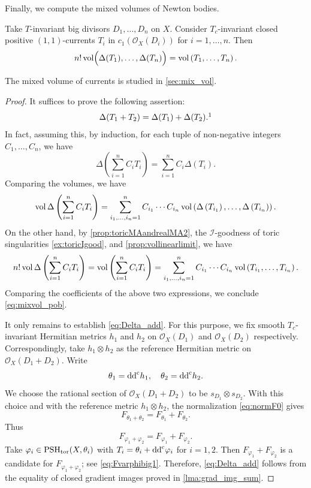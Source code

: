 Finally, we compute the mixed volumes of Newton bodies.
\begin{theorem}\label{thm:mix_vol_newbod}
Take $T$-invariant big divisors $D_1,\ldots,D_n$ on $X$. Consider $T_c$-invariant closed positive $(1,1)$-currents $T_i$ in $c_1(\mathcal{O}_X(D_i))$ for $i=1,\ldots,n$. Then
\begin{equation}\label{eq:mixvol_pob}
n! \operatorname{vol} \Bigl( \Delta(T_1),\ldots,\Delta(T_n) \Bigr)=\operatorname{vol} \left(T_1,\ldots,T_n \right).
\end{equation}
\end{theorem}
The mixed volume of currents is studied in \cref{sec:mix_vol}.
\begin{proof}
    It suffices to prove the following assertion:
    \begin{equation}\label{eq:Delta_add}
    \Delta(T_1+T_2)=\Delta(T_1)+\Delta(T_2).\footnotemark
    \end{equation}
    In fact, assuming this, by induction, for each tuple of non-negative integers $C_1,\ldots,C_n$, we have
    \[
    \Delta\left( \sum_{i=1}^n C_i T_i \right)=\sum_{i=1}^n C_i \Delta(T_i).
    \]
    Comparing the volumes, we have
    \[
    \operatorname{vol} \Delta\left( \sum_{i=1}^n C_i T_i \right)=\sum_{i_1,\ldots,i_n=1}^n C_{i_1}\cdots C_{i_n} \operatorname{vol} \left(\Delta\left(T_{i_1}\right),\ldots,\Delta\left(T_{i_n}\right)\right).
    \]
    On the other hand, by \cref{prop:toricMAandrealMA2}, the $\mathcal{I}$-goodness of toric singularities \cref{ex:toricIgood}, and \cref{prop:vollinearlimit}, we have
    \[
    n! \operatorname{vol} \Delta\left( \sum_{i=1}^n C_i T_i \right)=\operatorname{vol} \left( \sum_{i=1}^n C_i T_i \right)=\sum_{i_1,\ldots,i_n=1}^n C_{i_1}\cdots C_{i_n} \operatorname{vol} \left(T_{i_1},\ldots,T_{i_n}\right).
    \]
    Comparing the coefficients of the above two expressions, we conclude \eqref{eq:mixvol_pob}.

    It only remains to establish \eqref{eq:Delta_add}. For this purpose, we fix smooth $T_c$-invariant Hermitian metrics $h_1$ and $h_2$ on $\mathcal{O}_X(D_1)$ and $\mathcal{O}_X(D_2)$ respectively. Correspondingly, take $h_1\otimes h_2$ as the reference Hermitian metric on $\mathcal{O}_X(D_1+D_2)$. Write
    \[
    \theta_1=\mathrm{dd}^{\mathrm{c}} h_1,\quad \theta_2=\mathrm{dd}^{\mathrm{c}} h_2.
    \]
    We choose the rational section of $\mathcal O_X(D_1+D_2)$ to be $s_{D_1}\otimes s_{D_2}$. With this choice and with the reference metric $h_1\otimes h_2$, the normalization \eqref{eq:normF0} gives
    \[
        F_{\theta_1+\theta_2}=F_{\theta_1}+F_{\theta_2}.
    \]
    Thus
    \[
        F_{\varphi_1+\varphi_2}=F_{\varphi_1}+F_{\varphi_2}.
    \]
    Take $\varphi_i\in \mathrm{PSH}_{\mathrm{tor}}(X,\theta_i)$ with $T_i=\theta_i+\mathrm{dd}^{\mathrm{c}} \varphi_i$ for $i=1,2$. Then $F_{\varphi_1}+F_{\varphi_2}$ is a candidate for $F_{\varphi_1+\varphi_2}$; see \eqref{eq:Fvarphibig1}. Therefore, \eqref{eq:Delta_add} follows from the equality of closed gradient images proved in \cref{lma:grad_img_sum}.
\end{proof}
